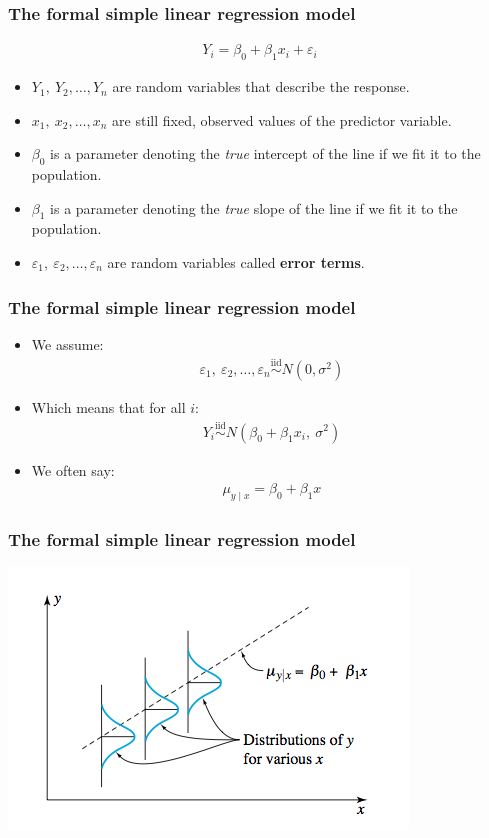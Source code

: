 \documentclass[handout]{beamer}\usepackage{graphicx, color}
\providecommand{\e}{\varepsilon}
\numberwithin{equation}{section}
\begin{document}
\begin{frame}
\frametitle{The formal simple linear regression model} \small
\begin{align*}
Y_i = \beta_0 + \beta_1 x_i + \e_i
\end{align*}
\begin{itemize}
\pause \item $Y_1, \ Y_2, \ldots, Y_n$ are random variables that describe the response.
\pause \item $x_1, \ x_2, \ldots, x_n$ are still fixed, observed values of the predictor variable.
\pause \item $\beta_0$ is a parameter denoting the \emph{true} intercept of the line if we fit it to the population.
\pause \item $\beta_1$ is a parameter denoting the \emph{true} slope of the line if we fit it to the population.
\pause \item $\e_1, \ \e_2, \ldots, \e_n$ are random variables called {\bf error terms}.
\end{itemize}
\end{frame}

\begin{frame}
\frametitle{The formal simple linear regression model} \small

\begin{itemize}
\item We assume:
\begin{align*}
\e_1, \ \e_2, \ldots, \e_n \stackrel{\text{iid}}{\sim} N(0, \sigma^2)
\end{align*}
\pause \item Which means that for all $i$:
\begin{align*}
Y_i \stackrel{\text{iid}}{\sim} N(\beta_0 + \beta_1 x_i, \ \sigma^2)
\end{align*}
\pause \item We often say:
\begin{align*}
\mu_{y \mid x} = \beta_0 + \beta_1 x
\end{align*}
\end{itemize}
\end{frame}

\begin{frame}
\frametitle{The formal simple linear regression model}
 \includegraphics{../../fig/normalsimplereg.png}
\end{frame}
\end{document}
